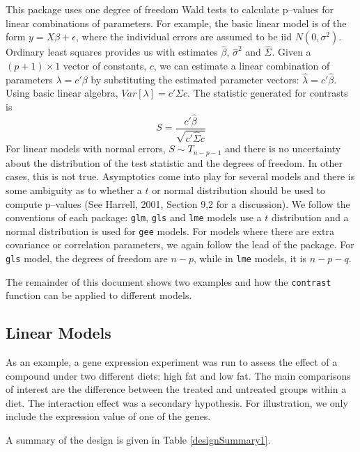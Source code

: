 \documentclass[12pt]{article}
\newcommand{\code}[1]{\mbox{\footnotesize\color{darkblue}\texttt{#1}}}
\begin{document}
This package uses one degree of freedom Wald tests to calculate p--values for linear combinations of parameters. For example, the basic linear model is of the form $y=X\beta+\epsilon$, where the individual errors are assumed to be iid $N(0, \sigma^2)$. Ordinary least squares provides us with estimates $\hat{\beta}$, $\hat{\sigma}^2$ and $\hat{\Sigma}$. Given a $(p+1)\times 1$ vector of constants, $c$, we can estimate a linear combination of parameters $\lambda = c'\beta$ by substituting the estimated parameter vectors: $\hat{\lambda} = c'\hat{\beta}$. Using basic linear algebra, $Var[\lambda] =  c'\Sigma c$. The statistic generated for contrasts is
\begin{equation}\label{E:Wald}
S = \frac{c'\hat{\beta}}{\sqrt{c'\hat{\Sigma} c}} 
\end{equation}
For linear models with normal errors, $S\sim T_{n-p-1}$ and there is no uncertainty about the distribution of the test statistic and the degrees of freedom. In other cases, this is not true. Asymptotics come into play for several models and there is some ambiguity as to whether a $t$ or normal distribution should be used to compute p--values (See Harrell, 2001, Section 9,2 for a discussion). We follow the conventions of each package: \code{glm}, \code{gls} and \code{lme} models use a $t$ distribution and a normal distribution is used for \code{gee} models. For models where there are extra covariance or correlation parameters, we again follow the lead of the package. For \code{gls} model, the degrees of freedom are $n-p$, while in \code{lme} models, it is $n-p-q$.

The remainder of this document shows two examples and how the \code{contrast} function can be applied to different models.

\subsection{Linear Models}
 


As an example, a gene expression experiment was run to assess the effect of a compound under two different diets: high fat and low fat. The main comparisons of interest are the difference between the treated and untreated groups within a diet. The interaction effect was a secondary hypothesis. For illustration, we only include the expression value of one of the genes.

A summary of the design is given in Table \ref{designSummary1}.
\end{document}
